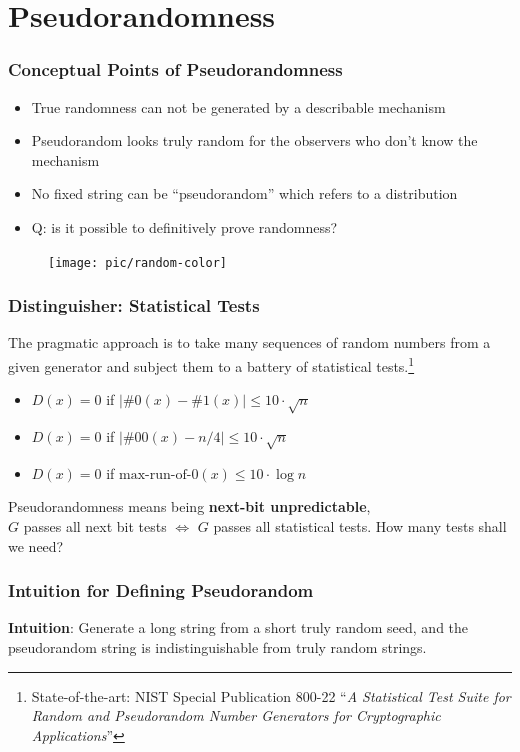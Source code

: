 \section{Pseudorandomness}
\begin{frame}\frametitle{Conceptual Points of Pseudorandomness}
\begin{itemize}
\item True randomness can not be generated by a describable mechanism
\item Pseudorandom looks truly random for the observers who don't know the mechanism 
\item No fixed string can be ``pseudorandom'' which refers to a distribution
\item \alert{Q: is it possible to definitively prove randomness?}
\end{itemize}
\begin{figure}
\begin{center}
\texttt{[image: pic/random-color]} 
\end{center}
\end{figure}
\end{frame}
\begin{frame}\frametitle{Distinguisher: Statistical Tests}
The pragmatic approach is to take many sequences of random numbers from a given generator and subject them to a battery of statistical tests.\footnote{State-of-the-art: NIST Special Publication 800-22 ``\emph{A Statistical Test Suite for Random and Pseudorandom Number Generators for Cryptographic Applications}''}
\begin{exampleblock}{}
\begin{itemize}
\item $D(x)=0$ if $\left| \#0(x) - \#1(x)\right| \le 10\cdot \sqrt{n}$
\item $D(x)=0$ if $\left| \#00(x) - n/4\right| \le 10\cdot \sqrt{n}$
\item $D(x)=0$ if $\text{max-run-of-}0(x) \le 10\cdot \log{n}$
\end{itemize}
\end{exampleblock}
Pseudorandomness means being \textbf{next-bit unpredictable},\\
$G$ passes all next bit tests $\iff$ $G$ passes all statistical tests.
How many tests shall we need?
\end{frame}
\begin{frame}\frametitle{Intuition for Defining Pseudorandom}
\textbf{Intuition}: Generate a long string from a short truly random seed, and the pseudorandom string is indistinguishable from truly random strings.
\begin{figure}
\begin{center}

\end{center}
\end{figure}
\end{frame}
